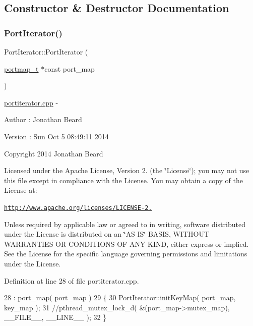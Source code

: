 \subsection{Constructor \& Destructor Documentation}
\hypertarget{class_port_iterator_a3d68fbe1ad98fbb8c7e25a9aecf8b5bf}{}\label{class_port_iterator_a3d68fbe1ad98fbb8c7e25a9aecf8b5bf} 
\subsubsection{\texorpdfstring{Port\+Iterator()}{PortIterator()}}
{\footnotesize\ttfamily Port\+Iterator\+::\+Port\+Iterator (\begin{DoxyParamCaption}\item[{\hyperlink{structportmap__t}{portmap\+\_\+t} $\ast$const}]{port\+\_\+map }\end{DoxyParamCaption})}

\hyperlink{portiterator_8cpp_source}{portiterator.\+cpp} -\/ \begin{DoxyAuthor}{Author}
\+: Jonathan Beard 
\end{DoxyAuthor}
\begin{DoxyVersion}{Version}
\+: Sun Oct 5 08\+:49\+:11 2014
\end{DoxyVersion}
Copyright 2014 Jonathan Beard

Licensed under the Apache License, Version 2. (the \char`\"{}\+License\char`\"{}); you may not use this file except in compliance with the License. You may obtain a copy of the License at\+:

\href{http://www.apache.org/licenses/LICENSE-2.0}{\tt http\+://www.\+apache.\+org/licenses/\+L\+I\+C\+E\+N\+S\+E-\/2.}

Unless required by applicable law or agreed to in writing, software distributed under the License is distributed on an \char`\"{}\+A\+S I\+S\char`\"{} B\+A\+S\+IS, W\+I\+T\+H\+O\+UT W\+A\+R\+R\+A\+N\+T\+I\+ES OR C\+O\+N\+D\+I\+T\+I\+O\+NS OF A\+NY K\+I\+ND, either express or implied. See the License for the specific language governing permissions and limitations under the License. 

Definition at line 28 of file portiterator.\+cpp.


\begin{DoxyCode}
28                                                        : port\_map( port\_map )
29 \{
30    PortIterator::initKeyMap( port\_map, key\_map );
31    \textcolor{comment}{//pthread\_mutex\_lock\_d( &(port\_map->mutex\_map), \_\_FILE\_\_, \_\_LINE\_\_ ); }
32 \}
\end{DoxyCode}



